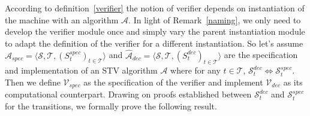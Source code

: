 \documentclass[10pt,conference]{IEEEtran}
\begin{document}
According to definition~\ref{verifier} the notion of verifier depends on instantiation of the machine with an algorithm $\mathcal{A}$. In light of Remark~\ref{naming}, we only need to develop the verifier module once and simply vary the parent instantiation module to adapt the definition of the verifier for a different instantiation. So let's assume $\hat{\mathcal{A}}_{spec}= \langle \mathcal{S}, \mathcal{T}, (S_{t}^{spec})_{t \in \mathcal{T}} \rangle$ and $\hat{\mathcal{A}}_{dec}= \langle \mathcal{S}, \mathcal{T}, (S_{t}^{dec})_{t \in \mathcal{T}} \rangle$ are the specification and implementation of an STV algorithm $\mathcal{A}$ where for any $t\in\mathcal{T}$, $\mathcal{S}_{t}^{dec}\Leftrightarrow\mathcal{S}_{t}^{spec}$. 
 Then we define $\mathcal{V}_{spec}$ as the specification of the verifier  and implement $\mathcal{V}_{dec}$ as its  computational counterpart. Drawing on proofs established between $\mathcal{S}_{t}^{dec}$ and $\mathcal{S}_{t}^{spec}$ for the transitions, we formally prove the following result.
\end{document}
